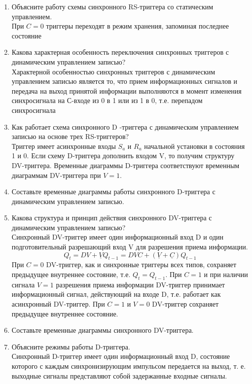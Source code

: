 \begin{enumerate}
	\item Объясните работу схемы синхронного RS-триггера со статическим управлением. \\
	При $C = 0$ триггеры переходят в режим хранения, запоминая последнее состояние
	\item Какова характерная особенность переключения синхронных триггеров с динамическим управлением записью? \\
	Характерной особенностью синхронных триггеров с динамическим управлением записью
является то, что прием информационных сигналов и передача на выход принятой информации
выполняются в момент изменения синхросигнала на С-входе из 0 в 1 или из 1 в 0, т.е.
перепадом синхросигнала
	\item Как работает схема синхронного D -триггера с динамическим управлением записью на основе трех RS-триггеров? \\
	Триггер имеет асинхронные входы $S_a$ и $R_a$ начальной установки в состояния 1 и 0. Если схему
D-триггера дополнить входом V, то получим структуру DV-триггера. Временные диаграммы D-триггера соответствуют временным диаграммам DV-триггера при $V = 1$.
	\item Составьте временные диаграммы работы синхронного D-триггера с динамическим управлением записью.
	\item Какова структура и принцип действия синхронного DV-триггера с динамическим управлением записью? \\
	Синхронный DV-триггер имеет один информационный вход D и один подготовительный
разрешающий вход V для разрешения приема информации.
	\begin{equation}
		Q_t = DV + \underline{V}Q_{t-1} = DVC + (\underline{V} + \underline{C})Q_{t-1}
	\end{equation}
	При $C = 0$ DV-триггер, как и синхронные триггеры всех типов, сохраняет предыдущее внутреннее
состояние, т.е. $Q_t = Q_{t-1}$. При $C = 1$ и при наличии сигнала $V = 1$ разрешения приема информации
DV-триггер принимает информационный сигнал, действующий на входе D, т.е. работает как
асинхронный DV-триггер. При $C = 1$ и $V = 0$ DV-триггер сохраняет предыдущее внутреннее
состояние.
	\item Составьте временные диаграммы синхронного DV-триггера.
	\item Объясните режимы работы D-триггера. \\
	Синхронный D-триггер имеет один информационный вход D, состояние которого с каждым
синхронизирующим импульсом передается на выход, т. е. выходные сигналы представляют
собой задержанные входные сигналы.

\end{enumerate}
